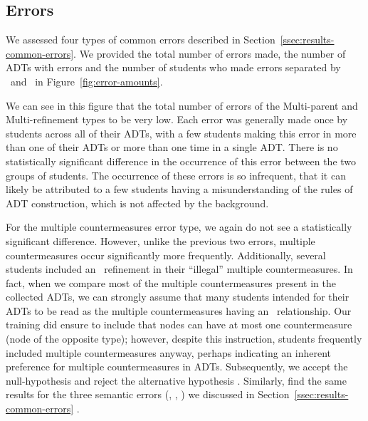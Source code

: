 \subsection{Errors}
\label{ssec:analysis-errors}

We assessed four types of common errors described in Section~\ref{ssec:results-common-errors}. We provided the total number of errors made, the number of ADTs with errors and the number of students who made errors separated by \ICS\ and \SEC\ in Figure~\ref{fig:error-amounts}.

We can see in this figure that the total number of errors of the Multi-parent and Multi-refinement types to be very low. Each error was generally made once by students across all of their ADTs, with a few students making this error in more than one of their ADTs or more than one time in a single ADT. There is no statistically significant difference in the occurrence of this error between the two groups of students. The occurrence of these errors is so infrequent, that it can likely be attributed to a few students having a misunderstanding of the rules of ADT construction, which is not affected by the background.%

For the multiple countermeasures error type, we again do not see a statistically significant difference. However, unlike the previous two errors, multiple countermeasures occur significantly more frequently. Additionally, several students included an \AND\ refinement in their ``illegal'' multiple countermeasures. In fact, when we compare most of the multiple countermeasures present in the collected ADTs, we can strongly assume that many students intended for their ADTs to be read as the multiple countermeasures having an \OR\ relationship. Our training did ensure to include that nodes can have at most one countermeasure (node of the opposite type); however, despite this instruction, students frequently included multiple countermeasures anyway, perhaps indicating an inherent preference for multiple countermeasures in ADTs. Subsequently, we accept the null-hypothesis \nullhypothesis{\hypoErrorAmount} and reject the alternative hypothesis \althypothesis{\hypoErrorAmount}. Similarly, find the same results for the three semantic errors (\hypothesis{\hypoMultipleParent}, \hypothesis{\hypoMultipleRefinement}, \hypothesis{\hypoMulipleCountermeasure}) we discussed in Section~\ref{ssec:results-common-errors} .


